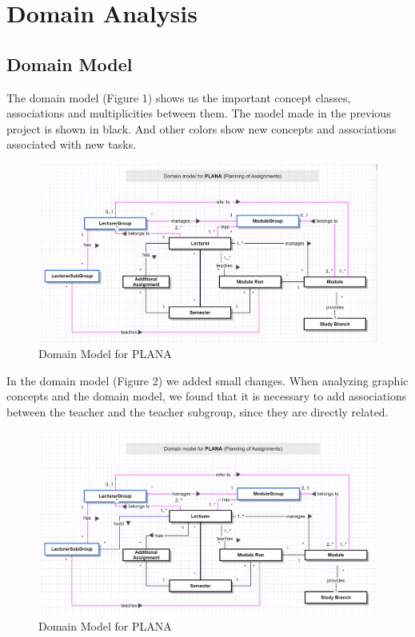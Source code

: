 \documentclass{scrartcl}
\begin{document}
\section{Domain Analysis}
\subsection{Domain Model}
The domain model (Figure 1) shows us the important concept classes, associations and
multiplicities between them. The model made in the previous project is shown in black. And other colors show new concepts and associations associated with new tasks.

\begin{figure}[H]
\centering
\includegraphics[width=150mm]{uml/domain-b.JPG}
\caption{Domain Model for PLANA}
\label{blabla}
\end{figure}

In the domain model (Figure 2) we added small changes.
When analyzing graphic concepts and the domain model, we found that it is necessary to add associations between the teacher and the teacher subgroup, since they are directly related. 


\begin{figure}[H]
\centering
\includegraphics[width=150mm]{uml/domain-b2.JPG}
\caption{Domain Model for PLANA}
\label{blabla}
\end{figure}
\end{document}
